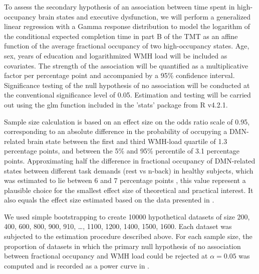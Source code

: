 To  assess the secondary hypothesis of an association between time spent in high-occupancy brain states and executive dysfunction, we will perform a generalized linear regression with a Gamma response distribution to model the logarithm of the conditional expected completion time in part B of the TMT as an affine function of the average fractional occupancy of two high-occupancy states.
Age, sex, years of education and logarithmized WMH load will be included as covariates.
The strength of the association will be quantified as a multiplicative factor per percentage point and accompanied by a 95\% confidence interval.
Significance testing of the null hypothesis of no association will be conducted at the conventional significance level of 0.05.
Estimation and testing will be carried out using the glm function included in the 'stats' package from R v4.2.1.

Sample size calculation is based on an effect size on the odds ratio scale of 0.95, corresponding to an absolute difference in the probability of occupying a DMN-related brain state between the first and third WMH-load quartile of 1.3 percentage points, and between the 5\% and 95\% percentile of 3.1 percentage points. Approximating half the difference in fractional occupancy of DMN-related states between different task demands (rest vs n-back) in healthy subjects, which was estimated to lie between 6 and 7 percentage points \citep{Cornblath2020-fu}, this value represent a plausible choice for the smallest effect size of theoretical and practical interest. It also equals the effect size estimated based on the data presented in \citep{Schlemm2022-he}. 

We used simple bootstrapping to create \num{10000} hypothetical datasets of size \num{200}, \num{400}, \num{600}, \num{800}, \num{900}, \num{910}, \ldots, \num{1100}, \num{1200}, \num{1400}, \num{1500}, \num{1600}.
Each dataset was subjected to the estimation procedure described above.
For each sample size, the proportion of datasets in which the primary null hypothesis of no association between fractional occupancy and WMH load could be rejected at $\alpha=0.05$ was computed and is recorded as a power curve in .

